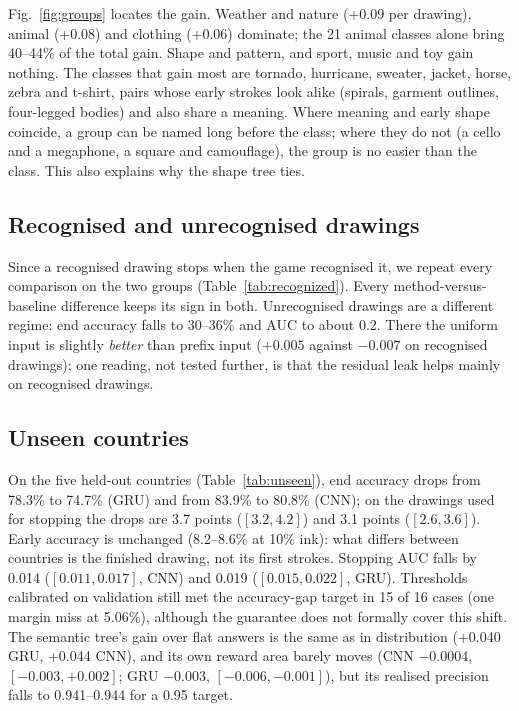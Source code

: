 Fig.~\ref{fig:groups} locates the gain. Weather and nature (+0.09 per drawing), animal (+0.08) and
clothing (+0.06) dominate; the 21 animal classes alone bring 40--44\% of the total gain. Shape and
pattern, and sport, music and toy gain nothing. The classes that gain most are tornado, hurricane,
sweater, jacket, horse, zebra and t-shirt, pairs whose early strokes look alike (spirals, garment
outlines, four-legged bodies) and also share a meaning. Where meaning and early shape coincide, a
group can be named long before the class; where they do not (a cello and a megaphone, a square and
camouflage), the group is no easier than the class. This also explains why the shape tree ties.

\subsection{Recognised and unrecognised drawings}
\label{sec:res-recognized}



Since a recognised drawing stops when the game recognised it, we repeat every comparison on the
two groups (Table~\ref{tab:recognized}). Every method-versus-baseline difference keeps its sign
in both. Unrecognised drawings are a different regime: end accuracy falls to 30--36\% and AUC to
about 0.2. There the uniform input is slightly \emph{better} than prefix input ($+0.005$
against $-0.007$ on recognised drawings); one reading, not tested further, is that the residual
leak helps mainly on recognised drawings.

\subsection{Unseen countries}
\label{sec:res-unseen}



On the five held-out countries (Table~\ref{tab:unseen}), end accuracy drops from 78.3\% to 74.7\%
(GRU) and from 83.9\% to 80.8\% (CNN); on the drawings used for stopping the drops are 3.7 points
($[3.2, 4.2]$) and 3.1 points ($[2.6, 3.6]$). Early accuracy is unchanged (8.2--8.6\% at 10\% ink):
what differs between countries is the finished drawing, not its first strokes. Stopping AUC falls
by 0.014 ($[0.011, 0.017]$, CNN) and 0.019 ($[0.015, 0.022]$, GRU). Thresholds calibrated on validation still met the accuracy-gap target in 15 of 16
cases (one margin miss at 5.06\%), although the guarantee does not formally cover this shift. The
semantic tree's gain over flat answers is the same as in distribution (+0.040 GRU, +0.044 CNN), and
its own reward area barely moves (CNN $-0.0004$, $[-0.003, +0.002]$; GRU $-0.003$,
$[-0.006, -0.001]$), but its realised precision falls to 0.941--0.944 for a 0.95 target.

